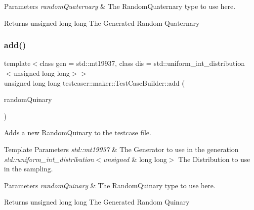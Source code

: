 \begin{DoxyParams}{Parameters}
{\em random\+Quaternary} & The Random\+Quaternary type to use here. \\
\hline
\end{DoxyParams}
\begin{DoxyReturn}{Returns}
unsigned long long The Generated Random Quaternary 
\end{DoxyReturn}
\mbox{\label{classtestcaser_1_1maker_1_1TestCaseBuilder_a8c036fe574ac265ebbe37225727047e6}} 
\subsubsection{\texorpdfstring{add()}{add()}\hspace{0.1cm}{\footnotesize\ttfamily [7/11]}}
{\footnotesize\ttfamily template$<$class gen  = std\+::mt19937, class dis  = std\+::uniform\+\_\+int\+\_\+distribution$<$unsigned long long$>$$>$ \\
unsigned long long testcaser\+::maker\+::\+Test\+Case\+Builder\+::add (\begin{DoxyParamCaption}\item[{\mbox{\hyperlink{structtestcaser_1_1maker_1_1types_1_1RandomQuinary}{types\+::\+Random\+Quinary}}$<$ gen, dis $>$ \&}]{random\+Quinary }\end{DoxyParamCaption})\hspace{0.3cm}{\ttfamily [inline]}}



Adds a new Random\+Quinary to the testcase file. 


\begin{DoxyTemplParams}{Template Parameters}
{\em std\+::mt19937} & The Generator to use in the generation \\
\hline
{\em std\+::uniform\+\_\+int\+\_\+distribution$<$unsigned} & long long$>$ The Distribution to use in the sampling. \\
\hline
\end{DoxyTemplParams}

\begin{DoxyParams}{Parameters}
{\em random\+Quinary} & The Random\+Quinary type to use here. \\
\hline
\end{DoxyParams}
\begin{DoxyReturn}{Returns}
unsigned long long The Generated Random Quinary 
\end{DoxyReturn}
\mbox{\label{classtestcaser_1_1maker_1_1TestCaseBuilder_a60ef1510e12a3cc6018c7b198a2165e5}} 
